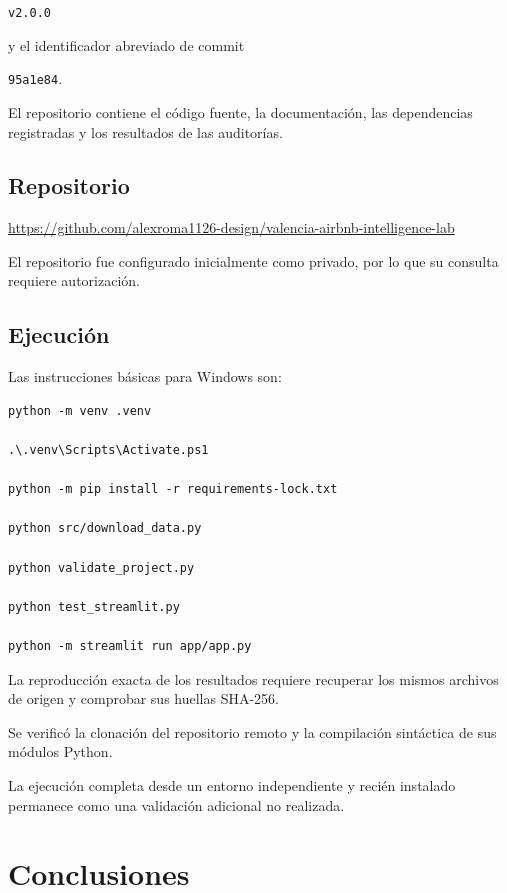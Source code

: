 \documentclass[11pt,a4paper]{article}
\begin{document}
\begin{center}
\texttt{v2.0.0}
\end{center}

y el identificador abreviado de commit

\begin{center}
\texttt{95a1e84}.
\end{center}

El repositorio contiene el código fuente,
la documentación, las dependencias registradas
y los resultados de las auditorías.

\subsection{Repositorio}

\url{https://github.com/alexroma1126-design/valencia-airbnb-intelligence-lab}

El repositorio fue configurado inicialmente como
privado, por lo que su consulta requiere autorización.

\subsection{Ejecución}

Las instrucciones básicas para Windows son:

\begin{verbatim}
python -m venv .venv

.\.venv\Scripts\Activate.ps1

python -m pip install -r requirements-lock.txt

python src/download_data.py

python validate_project.py

python test_streamlit.py

python -m streamlit run app/app.py
\end{verbatim}

La reproducción exacta de los resultados requiere
recuperar los mismos archivos de origen y comprobar
sus huellas SHA-256.

Se verificó la clonación del repositorio remoto
y la compilación sintáctica de sus módulos Python.

La ejecución completa desde un entorno independiente
y recién instalado permanece como una validación
adicional no realizada.


\section{Conclusiones}
\end{document}
